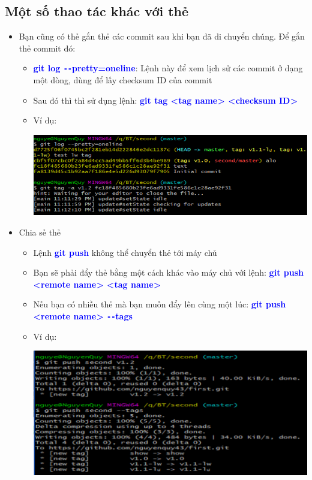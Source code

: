 \documentclass[12pt,a4paper]{report}
\begin{document}
\subsection{Một số thao tác khác với thẻ}
\begin{itemize}
\item Bạn cũng có thẻ gắn thẻ các commit sau khi bạn đã di chuyển chúng. Để gắn thẻ commit đó:
\begin{itemize}
\item \textcolor{blue}{\bf git log \texttt{-{}-}pretty=oneline}: Lệnh này để xem lịch sử các commit ở dạng một dòng, dùng để lấy checksum ID của commit
\item Sau đó thì thì sử dụng lệnh: \textcolor{blue}{\bf git tag <tag name> <checksum ID>}
\item Ví dụ: 

	\includegraphics[width=0.8\linewidth]{screenshot044}

	\label{fig:screenshot044}
\end{itemize}
\item Chia sẻ thẻ
\begin{itemize}
\item Lệnh \textcolor{blue}{\bf git push} không thể chuyển thẻ tới máy chủ
\item Bạn sẽ phải đẩy thẻ bằng một cách khác vào máy chủ với lệnh: \textcolor{blue}{\bf git push <remote name> <tag name>}
\item Nếu bạn có nhiều thẻ mà bạn muốn đẩy lên cùng một lúc: \textcolor{blue}{\bf git push <remote name> \texttt{-{}-}tags}
\item Ví dụ:

	\includegraphics[width=0.8\linewidth]{screenshot045}


\end{itemize}
\end{itemize}
\end{document}
